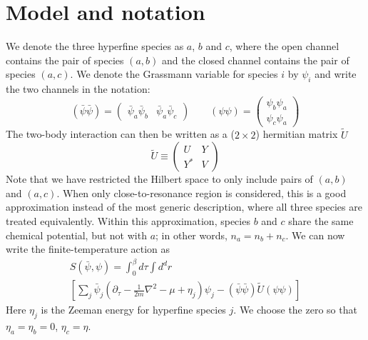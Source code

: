 \documentclass[reprint,pra]{revtex4-1}
\newcommand{\nth}[1]{\ensuremath{\frac{1}{#1}}}
\newcommand{\mbr}[1]{\ensuremath{\left[#1\right]}}
\newcommand{\mtrx}[1]{\ensuremath{\begin{pmatrix}#1\end{pmatrix}}}
\begin{document}
\section{Model and notation\label{sec:model}}
We denote the three hyperfine species as $a$, $b$ and $c$, where the open channel contains the pair of species $(a,b)$ and the closed channel contains the pair of species $(a,c)$.  We denote the Grassmann variable for species $i$ by $\psi_i$ and write the  two channels in the notation:
\begin{equation}
(\bar\psi\bar\psi)=\mtrx{\bar\psi_{a}\bar\psi_{b}&\bar\psi_{a}\bar\psi_{c}}
\qquad(\psi\psi)=\mtrx{\psi_{b}\psi_{a}\\\psi_{c}\psi_{a}}
\end{equation}
The two-body interaction can then be written as a ($2\times2$)  hermitian  matrix  $\tilde{U}$ 
\begin{equation}
\tilde{U}\equiv{}\mtrx{U&Y\\Y^{*}&V}
\end{equation}
 Note that we have restricted the Hilbert space to only include pairs of $(a,b)$ and $(a,c)$.  When only close-to-resonance region is considered, this is a good approximation instead of  the most generic description, where all three species are treated equivalently.  Within this approximation, species $b$ and $c$ share the same chemical potential, but not with $a$; in other words, $n_a=n_b+n_c$.  
  We can now write the finite-temperature action as 
\begin{multline}\label{eq:pathInt2:actionFermi}
S(\bar\psi,\psi)=\int^{\beta}_{0}d\tau\int{d^{d}r}\\
\mbr{\sum_{j}\bar\psi_{j}(\partial_\tau-\nth{2m}\nabla^{2}-\mu+\eta_{j})\psi_{j}
-(\bar\psi\bar\psi)\tilde{U}(\psi\psi)}
\end{multline}
Here $\eta_{j}$ is the Zeeman energy for hyperfine species $j$. We choose the zero so that $\eta_{a}=\eta_{b}=0$, $\eta_{c}=\eta$.    
\end{document}
